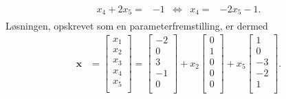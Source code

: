 \begin{eks}
\begin{align*}
\begin{array}{rrcll}
x_4+2x_5    =&-1   &\iff &x_4   =&-2x_5-1.
\end{array}
\end{align*}
%
Løsningen, opskrevet som en parameterfremstilling, er dermed
%
  \begin{align*}
    \mathbf{x} &= \begin{bmatrix}
           x_{1} \\
           x_{2} \\
           x_{3} \\
           x_{4} \\
           x_{5} \\
         \end{bmatrix} 
         = \begin{bmatrix}
           -2 \\
           0 \\
           3 \\
           -1 \\
           0 \\
         \end{bmatrix}
         +x_2 \begin{bmatrix}
           0 \\
           1 \\
           0 \\
           0 \\
           0 \\
         \end{bmatrix}
         +x_5 \begin{bmatrix}
           1 \\
           0 \\
           -3 \\
           -2 \\
           1 \\
         \end{bmatrix}.
  \end{align*} 
%
\label{eks_gauss}
%
%
\end{eks}
%
%
